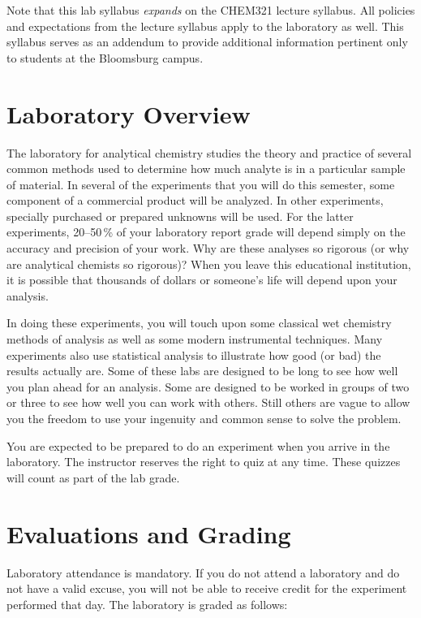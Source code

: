 \documentclass[11pt,letterpaper]{article}
\begin{document}
\begin{mdframed}
	Note that this lab syllabus \emph{expands} on the CHEM321 lecture
	syllabus. All policies and expectations from the lecture syllabus apply
	to the laboratory as well. This syllabus serves as an addendum to
	provide additional information pertinent only to students at the
	Bloomsburg campus.
\end{mdframed}

\section{Laboratory Overview}
The laboratory for analytical chemistry studies the theory and practice of
several common methods used to determine how much analyte is in a particular
sample of material. In several of the experiments that you will do this
semester, some component of a commercial product will be analyzed. In other
experiments, specially purchased or prepared unknowns will be used. For the
latter experiments, 20--50\,\% of your laboratory report grade will
depend simply on the accuracy and precision of your work. Why are these analyses
so rigorous (or why are analytical chemists so rigorous)? When you leave this
educational institution, it is possible that thousands of dollars or someone's
life will depend upon your analysis. 

In doing these experiments, you will touch upon some classical wet chemistry
methods of analysis as well as some modern instrumental techniques. Many
experiments also use statistical analysis to illustrate how good (or bad)
the results actually are. Some of these labs are designed to be long to see how
well you plan ahead for an analysis. Some are designed to be worked in groups of
two or three to see how well you can work with others. Still others are vague to
allow you the freedom to use your ingenuity and common sense to solve the
problem.

You are expected to be prepared to do an experiment when you arrive in the
laboratory. The instructor reserves the right to quiz at any time. These
quizzes will count as part of the lab grade.

\section{Evaluations and Grading}

Laboratory attendance is mandatory. If you do not attend a laboratory and do not
have a valid excuse, you will not be able to receive credit for the experiment
performed that day. The laboratory is graded as follows:
\end{document}

